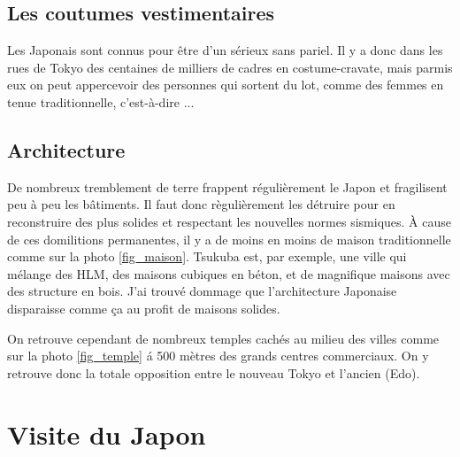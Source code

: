 \documentclass[journal]{RapportFR}
\begin{document}
\begin{CJK*}{UTF8}{min}

\subsection{Les coutumes vestimentaires}

Les Japonais sont connus pour \^etre d'un s\'erieux sans pariel. Il y a donc dans les rues de Tokyo des centaines de milliers de cadres en costume-cravate, mais parmis eux on peut appercevoir des personnes qui sortent du lot, comme des femmes en tenue traditionnelle, c'est-\`a-dire ...

\subsection{Architecture}

De nombreux tremblement de terre frappent r\'eguli\`erement le Japon et fragilisent peu \`a peu les b\^atiments. Il faut donc r\`eguli\`erement les d\'etruire pour en reconstruire des plus solides et respectant les nouvelles normes sismiques.
\`A cause de ces domilitions permanentes, il y a de moins en moins de maison traditionnelle comme sur la photo \ref{fig_maison}. Tsukuba est, par exemple, une ville qui m\'elange des HLM, des maisons cubiques en b\'eton, et de magnifique maisons avec des structure en bois. J'ai trouv\'e dommage que l'architecture Japonaise disparaisse comme \c{c}a au profit de maisons solides.


On retrouve cependant de nombreux temples cach\'es au milieu des villes comme sur la photo \ref{fig_temple} \'a 500 m\`etres des grands centres commerciaux. On y retrouve donc la totale opposition entre le nouveau Tokyo et l'ancien (Edo). 


\section{Visite du Japon}


\end{CJK*}
\end{document}
